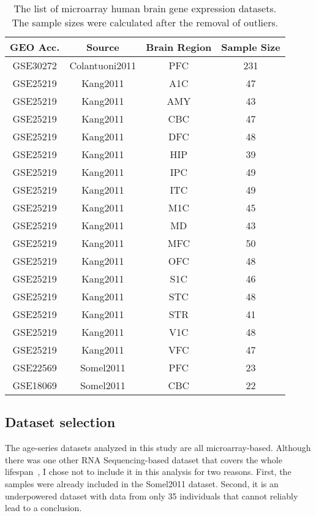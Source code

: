 \begin{table}[!ht]
\centering
\caption{The list of microarray human brain gene expression datasets. The sample sizes were calculated after the removal of outliers.}\label{table:table1}
\begin{tabular}{|c c c c|}
 \hline
 \textbf{GEO Acc.} & \textbf{Source} & \textbf{Brain Region} & \textbf{Sample Size} \\
 \hline
 GSE30272 & Colantuoni2011 & PFC & 231 \\   \hline
 GSE25219 & Kang2011 & A1C & 47 \\  \hline
 GSE25219 & Kang2011 & AMY & 43 \\  \hline
 GSE25219 & Kang2011 & CBC & 47 \\  \hline
 GSE25219 & Kang2011 & DFC & 48 \\  \hline
 GSE25219 & Kang2011 & HIP & 39 \\  \hline
 GSE25219 & Kang2011 & IPC & 49 \\  \hline
 GSE25219 & Kang2011 & ITC & 49 \\  \hline
 GSE25219 & Kang2011 & M1C & 45 \\  \hline
 GSE25219 & Kang2011 & MD & 43 \\   \hline
 GSE25219 & Kang2011 & MFC & 50 \\  \hline
 GSE25219 & Kang2011 & OFC & 48 \\  \hline
 GSE25219 & Kang2011 & S1C & 46 \\  \hline
 GSE25219 & Kang2011 & STC & 48 \\  \hline
 GSE25219 & Kang2011 & STR & 41 \\  \hline
 GSE25219 & Kang2011 & V1C & 48 \\  \hline
 GSE25219 & Kang2011 & VFC & 47 \\  \hline
 GSE22569 & Somel2011 & PFC & 23 \\ \hline
 GSE18069 & Somel2011 & CBC & 22 \\ \hline
\end{tabular}
\end{table}

\subsection{Dataset selection}
The age-series datasets analyzed in this study are all microarray-based. 
Although there was one other RNA Sequencing-based dataset that covers the whole lifespan~\autocite{Mazin2013}, I chose not to include it in this analysis for two reasons.
First, the samples were already included in the Somel2011 dataset. 
Second, it is an underpowered dataset with data from only 35 individuals that cannot reliably lead to a conclusion.

